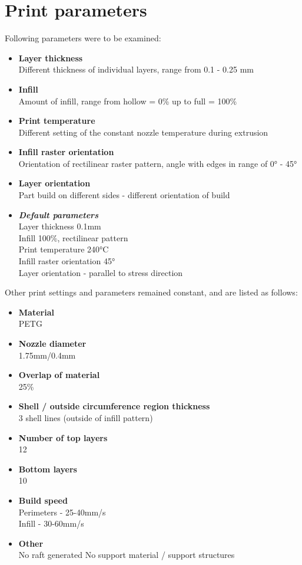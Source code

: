 \documentclass[a4paper, twoside, 11pt]{report}
\begin{document}
\section{Print parameters}
Following parameters were to be examined:
\begin{itemize}
\item \textbf{Layer thickness}\\
	Different thickness of individual layers, range from 0.1 - 0.25 mm
\item \textbf{Infill}\\
	Amount of infill, range from hollow = 0\% up to full = 100\%
\item \textbf{Print temperature}\\
	Different setting of the constant nozzle temperature during extrusion
\item \textbf{Infill raster orientation}\\
	Orientation of rectilinear raster pattern, angle with edges in range of 0° - 45°
\item \textbf{Layer orientation}\\
	Part build on different sides - different orientation of build
\item \textbf{\textit{Default parameters}}\\
Layer thickness 0.1mm\\
Infill 100\%, rectilinear pattern\\
Print temperature 240°C\\
Infill raster orientation 45°\\
Layer orientation - parallel to stress direction
\end{itemize}
\bigskip
%
Other print settings and parameters remained constant, and are listed as follows:
\begin{itemize}
\item \textbf{Material}\\
	PETG
\item \textbf{Nozzle diameter}\\
	1.75mm/0.4mm
\item \textbf{Overlap of material}\\
	25\%
\item \textbf{Shell / outside circumference region thickness}\\
	3 shell lines (outside of infill pattern)
\item \textbf{Number of top layers}\\
	12
\item \textbf{Bottom layers}\\
	10
\item \textbf{Build speed}\\
	Perimeters - 25-40mm/s\\
	Infill - 30-60mm/s
\item \textbf{Other}\\
	No raft generated
	No support material / support structures
\end{itemize}
\end{document}
